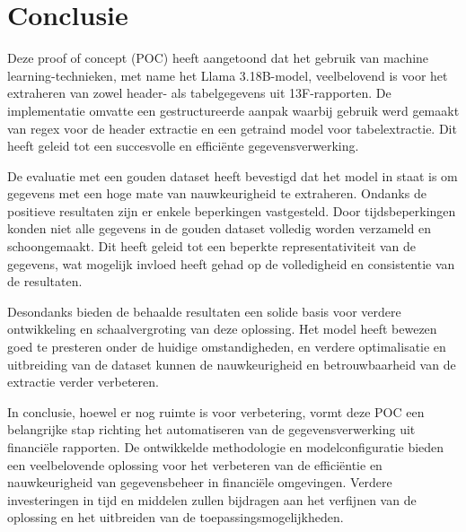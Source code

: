 \section{Conclusie}
Deze proof of concept (POC) heeft aangetoond dat het gebruik van machine learning-technieken, met name het Llama 3.18B-model, veelbelovend is voor het extraheren van zowel header- als tabelgegevens uit 13F-rapporten. De implementatie omvatte een gestructureerde aanpak waarbij gebruik werd gemaakt van regex voor de header extractie en een getraind model voor tabelextractie. Dit heeft geleid tot een succesvolle en efficiënte gegevensverwerking.

De evaluatie met een gouden dataset heeft bevestigd dat het model in staat is om gegevens met een hoge mate van nauwkeurigheid te extraheren. Ondanks de positieve resultaten zijn er enkele beperkingen vastgesteld. Door tijdsbeperkingen konden niet alle gegevens in de gouden dataset volledig worden verzameld en schoongemaakt. Dit heeft geleid tot een beperkte representativiteit van de gegevens, wat mogelijk invloed heeft gehad op de volledigheid en consistentie van de resultaten.

Desondanks bieden de behaalde resultaten een solide basis voor verdere ontwikkeling en schaalvergroting van deze oplossing. Het model heeft bewezen goed te presteren onder de huidige omstandigheden, en verdere optimalisatie en uitbreiding van de dataset kunnen de nauwkeurigheid en betrouwbaarheid van de extractie verder verbeteren.

In conclusie, hoewel er nog ruimte is voor verbetering, vormt deze POC een belangrijke stap richting het automatiseren van de gegevensverwerking uit financiële rapporten. De ontwikkelde methodologie en modelconfiguratie bieden een veelbelovende oplossing voor het verbeteren van de efficiëntie en nauwkeurigheid van gegevensbeheer in financiële omgevingen. Verdere investeringen in tijd en middelen zullen bijdragen aan het verfijnen van de oplossing en het uitbreiden van de toepassingsmogelijkheden.






